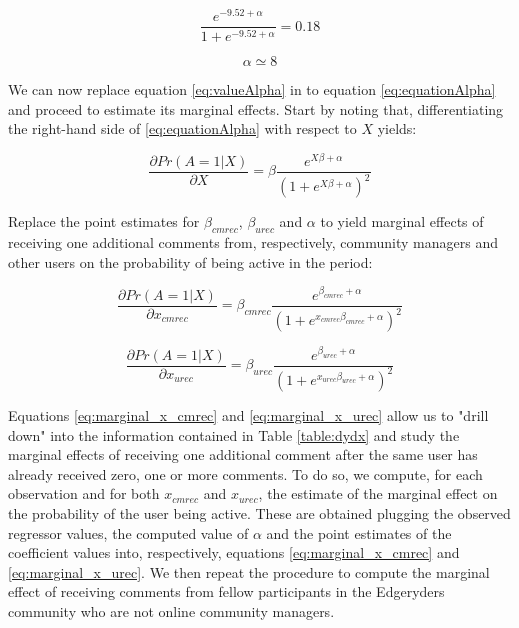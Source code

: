 \begin{equation}
	\frac{e^{-9.52 + \alpha}}{1 + e^{-9.52 + \alpha}} = 0.18
\end{equation}

\begin{equation}
	\alpha \simeq 8
	\label{eq:valueAlpha}
\end{equation}

We can now replace equation \ref{eq:valueAlpha} in to equation \ref{eq:equationAlpha} and proceed to estimate its marginal effects. Start by noting that, differentiating the right-hand side of \ref{eq:equationAlpha} with respect to $X$ yields:

\begin{equation}
	\frac{\partial Pr(A=1|X)}{\partial X} = \beta \frac{e^{X \beta + \alpha}}{(1 + e^{X \beta + \alpha})^2} 
\end{equation}

Replace the point estimates for $\beta_{cmrec}$, $\beta_{urec}$ and $\alpha$ to yield marginal effects of receiving one additional comments from, respectively, community managers and other users on the probability of being active in the period: 

\begin{equation}
	\frac{\partial Pr(A=1|X)}{\partial x_{cmrec}} = \beta_{cmrec} \frac{e^{ \beta_{cmrec} + \alpha}}{(1 + e^{x_{cmrec} \beta_{cmrec} + \alpha})^2} 
	\label{eq:marginal_x_cmrec}
\end{equation}

\begin{equation}
	\frac{\partial Pr(A=1|X)}{\partial x_{urec}} = \beta_{urec} \frac{e^{ \beta_{urec} + \alpha}}{(1 + e^{x_{urec} \beta_{urec} + \alpha})^2} 
	\label{eq:marginal_x_urec}
\end{equation}

Equations \ref{eq:marginal_x_cmrec} and \ref{eq:marginal_x_urec} allow us to "drill down" into the information contained in Table \ref{table:dydx} and study the marginal effects of receiving one additional comment after the same user has already received zero, one or more comments. To do so, we compute, for each observation and for both $x_{cmrec}$ and $x_{urec}$, the estimate of the marginal effect on the probability of the user being active. These are obtained plugging the observed regressor values, the computed value of $\alpha$ and the point estimates of the coefficient values into, respectively, equations \ref{eq:marginal_x_cmrec} and \ref{eq:marginal_x_urec}. We then repeat the procedure to compute the marginal effect of receiving comments from fellow participants in the Edgeryders community who are not online community managers. 


